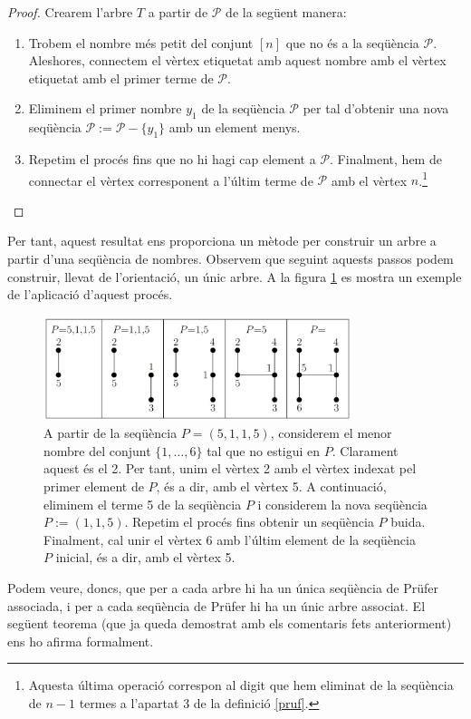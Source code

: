 \documentclass{article}
\begin{document}
\begin{proof}
    Crearem l'arbre $T$ a partir de $\mathcal{P}$ de la següent manera:
    \begin{enumerate}
        \item Trobem el nombre més petit del conjunt $[n]$ que no és a la seqüència $\mathcal{P}$. Aleshores, connectem el vèrtex etiquetat amb aquest nombre amb el vèrtex etiquetat amb el primer terme de $\mathcal{P}$.
        \item Eliminem el primer nombre $y_1$ de la seqüència $\mathcal{P}$ per tal d'obtenir una nova seqüència $\mathcal{P}:=\mathcal{P}-\{y_1\}$ amb un element menys.
        \item Repetim el procés fins que no hi hagi cap element a $\mathcal{P}$. Finalment, hem de connectar el vèrtex corresponent a l'últim terme de $\mathcal{P}$ amb el vèrtex $n$.\footnote{Aquesta última operació correspon al digit que hem eliminat de la seqüència de $n-1$ termes a l'apartat 3 de la definició \ref{pruf}.} \cite{3}
    \end{enumerate}
\end{proof}
Per tant, aquest resultat ens proporciona un mètode per construir un arbre a partir d'una seqüència de nombres. Observem que seguint aquests passos podem construir, llevat de l'orientació, un únic arbre. A la figura \ref{pruf2} es mostra un exemple de l'aplicació d'aquest procés.\par
\begin{figure}[H]
    \centering
    \includegraphics[width=9cm]{Imatges/prufer2.jpg}
    \caption{A partir de la seqüència $P=(5,1,1,5)$, considerem el menor nombre del conjunt $\{1,\ldots,6\}$ tal que no estigui en $P$. Clarament aquest és el 2. Per tant, unim el vèrtex 2 amb el vèrtex indexat pel primer element de $P$, és a dir, amb el vèrtex 5. A continuació, eliminem el terme 5 de la seqüència $P$ i considerem la nova seqüència $P:=(1,1,5)$. Repetim el procés fins obtenir un seqüència $P$ buida. Finalment, cal unir el vèrtex 6 amb l'últim element de la seqüència $P$ inicial, és a dir, amb el vèrtex 5. \cite{3}}
    \label{pruf2}
\end{figure}
Podem veure, doncs, que per a cada arbre hi ha un única seqüència de Prüfer associada, i per a cada seqüència de Prüfer hi ha un únic arbre associat. El següent teorema (que ja queda demostrat amb els comentaris fets anteriorment) ens ho afirma formalment.
\end{document}
